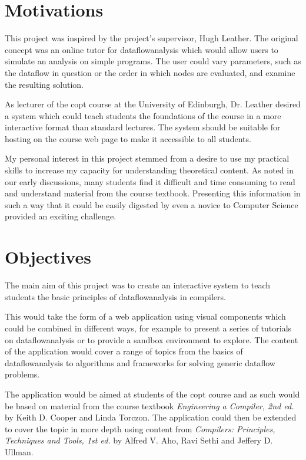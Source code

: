 \documentclass[bsc,twoside,singlespacing,parskip,logo,notimes,normalheadings]{infthesis}
\begin{document}
    \section{Motivations}
    This project was inspired by the project's supervisor, Hugh
    Leather. The original concept was an online tutor for
    \gls{dataflowanalysis} which would allow users to simulate an
    analysis on simple programs. The user could vary parameters, such
    as the \gls{dataflow} in question or the order in which nodes are
    evaluated, and examine the resulting solution.
    
    As lecturer of the \gls{copt} course at the University
    of Edinburgh, Dr. Leather desired a system which could teach
    students the foundations of the course in a more interactive
    format than standard lectures. The system should be suitable for
    hosting on the course web page to make it accessible to all
    students.
    
    My personal interest in this project stemmed from a desire to use
    my practical skills to increase my capacity for understanding
    theoretical content. As noted in our early discussions, many
    students find it difficult and time consuming to read and
    understand material from the course textbook. Presenting this
    information in such a way that it could be easily digested by even
    a novice to Computer Science provided an exciting challenge.
    
    
    \section{Objectives}
    The main aim of this project was to create an interactive system
    to teach students the basic principles of \gls{dataflowanalysis}
    in compilers.
    
    This would take the form of a web application using visual
    components which could be combined in different ways, for example
    to present a series of tutorials on \gls{dataflowanalysis} or to
    provide a sandbox environment to explore. The content of the
    application would cover a range of topics from the basics of
    \gls{dataflowanalysis} to algorithms and frameworks for solving
    generic \gls{dataflow} problems.
    
    The application would be aimed at students of the \gls{copt}
    course and as such would be based on material from the course
    textbook {\em Engineering a Compiler, 2nd ed.}\cite{eac} by Keith
    D. Cooper and Linda Torczon. The application could then be
    extended to cover the topic in more depth using content from {\em
      Compilers: Principles, Techniques and Tools, 1st
      ed.}\cite{dragonbook} by Alfred V. Aho, Ravi Sethi and Jeffery
    D. Ullman.
    
\end{document}
